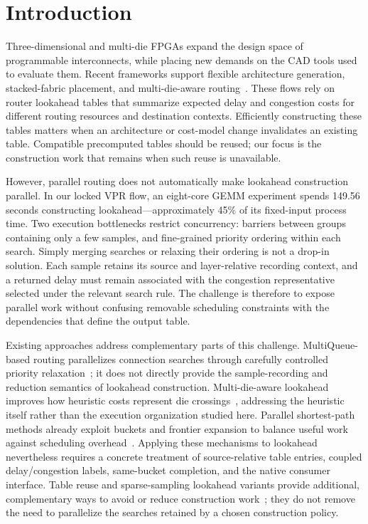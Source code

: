 \section{Introduction}
Three-dimensional and multi-die FPGAs expand the design space of programmable interconnects, while placing new demands on the CAD tools used to evaluate them. Recent frameworks support flexible architecture generation, stacked-fabric placement, and multi-die-aware routing~\cite{lazagna,flatland,multidie}. These flows rely on router lookahead tables that summarize expected delay and congestion costs for different routing resources and destination contexts. Efficiently constructing these tables matters when an architecture or cost-model change invalidates an existing table. Compatible precomputed tables should be reused; our focus is the construction work that remains when such reuse is unavailable.

However, parallel routing does not automatically make lookahead construction parallel. In our locked VPR flow, an eight-core GEMM experiment spends 149.56 seconds constructing lookahead---approximately 45\% of its fixed-input process time. Two execution bottlenecks restrict concurrency: barriers between groups containing only a few samples, and fine-grained priority ordering within each search. Simply merging searches or relaxing their ordering is not a drop-in solution. Each sample retains its source and layer-relative recording context, and a returned delay must remain associated with the congestion representative selected under the relevant search rule. The challenge is therefore to expose parallel work without confusing removable scheduling constraints with the dependencies that define the output table.

Existing approaches address complementary parts of this challenge. MultiQueue-based routing parallelizes connection searches through carefully controlled priority relaxation~\cite{multiqueue}; it does not directly provide the sample-recording and reduction semantics of lookahead construction. Multi-die-aware lookahead improves how heuristic costs represent die crossings~\cite{multidie}, addressing the heuristic itself rather than the execution organization studied here. Parallel shortest-path methods already exploit buckets and frontier expansion to balance useful work against scheduling overhead~\cite{delta,gpu_sssp}. Applying these mechanisms to lookahead nevertheless requires a concrete treatment of source-relative table entries, coupled delay/congestion labels, same-bucket completion, and the native consumer interface. Table reuse and sparse-sampling lookahead variants provide additional, complementary ways to avoid or reduce construction work~\cite{vproptions}; they do not remove the need to parallelize the searches retained by a chosen construction policy.

